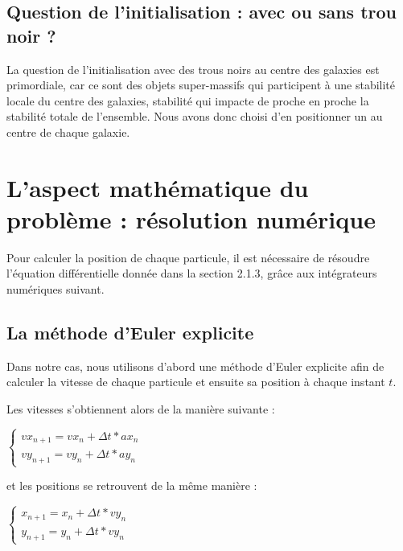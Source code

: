 \vspace{3mm}
\subsection{Question de l'initialisation : avec ou sans trou noir ?}
\vspace{2mm}

La question de l'initialisation avec des trous noirs au centre des galaxies est primordiale, car ce sont des objets super-massifs qui participent à une stabilité locale du centre des galaxies, stabilité qui impacte de proche en proche la stabilité totale de l'ensemble. Nous avons donc choisi d'en positionner un au centre de chaque galaxie.

\section{L'aspect mathématique du problème : résolution numérique}

Pour calculer la position de chaque particule, il est nécessaire de résoudre l'équation différentielle donnée dans la section 2.1.3, grâce aux intégrateurs numériques suivant.

\subsection{La méthode d'Euler explicite}

Dans notre cas, nous utilisons d'abord une méthode d'Euler explicite afin de calculer la vitesse de chaque particule et ensuite sa position à chaque instant $t$.

\vspace{2mm}
Les vitesses s'obtiennent alors de la manière suivante :
\vspace{2mm}

$
\left\{
    \begin{array}{ll}
        vx_{n+1} =vx_{n} + \Delta t *ax_{n} \\
        vy_{n+1} =vy_{n} + \Delta t *ay_{n}
    \end{array}
\right.
$

\vspace{2mm}
et les positions se retrouvent de la même manière :
\vspace{2mm}

$
\left\{
    \begin{array}{ll}
        x_{n+1} =x_{n} + \Delta t *vy_{n} \\
        y_{n+1} =y_{n} + \Delta t *vy_{n}
    \end{array}
\right.
$

